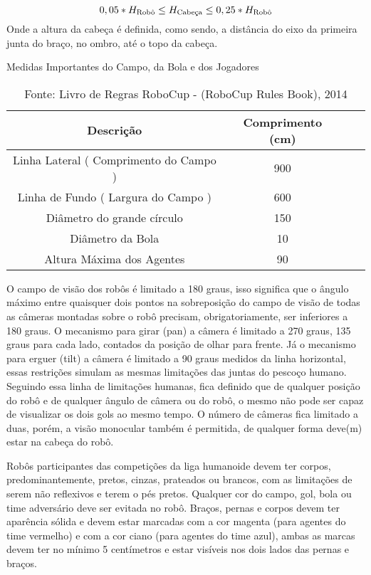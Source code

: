 \begin{equation}
0,05 * H_{\text{Robô}} \leq H_{\text{Cabeça}} \leq 0,25 * H_{\text{Robô}}  \\
\end{equation}
Onde a altura da cabeça é definida, como sendo, a distância do eixo da primeira junta do braço, no ombro, até o topo da cabeça.

\begin{table}[ht!]
    \caption{Medidas Importantes do Campo, da Bola e dos Jogadores} \label{tbl:medidas}
    \centering
    \begin{tabular}{|c|c|c|c|}
    \hline 
    Descrição & Comprimento (cm) \\ 
    \hline 
    Linha Lateral ( Comprimento do Campo ) & 900  \\ 
    \hline 
    Linha de Fundo ( Largura do Campo ) & 600 \\ 
    \hline 
    Diâmetro do grande círculo & 150 \\ 
    \hline 
    Diâmetro da Bola & 10 \\ 
    \hline 
    Altura Máxima dos Agentes & 90 \\ 
    \hline 

    \end{tabular}
    \caption*{Fonte: Livro de Regras RoboCup - (RoboCup Rules Book), 2014 \cite{Rules}}
\end{table}

O campo de visão dos robôs é limitado a 180 graus, isso significa que o ângulo máximo entre quaisquer dois pontos na sobreposição do campo de visão de todas as câmeras montadas sobre o robô precisam, obrigatoriamente, ser inferiores a 180 graus. O mecanismo para girar (pan) a câmera é limitado a 270 graus, 135 graus para cada lado, contados da posição de olhar para frente. Já o mecanismo para erguer (tilt) a câmera é limitado a 90 graus medidos da linha horizontal, essas restrições simulam as mesmas limitações das juntas do pescoço humano. Seguindo essa linha de limitações humanas, fica definido que de qualquer posição do robô e de qualquer ângulo de câmera ou do robô, o mesmo não pode ser capaz de visualizar os dois gols ao mesmo tempo. O número de câmeras fica limitado a duas, porém, a visão monocular também é permitida, de qualquer forma deve(m) estar na cabeça do robô.

Robôs participantes das competições da liga humanoide devem ter corpos, predominantemente, pretos, cinzas, prateados ou brancos, com as limitações de serem não reflexivos e terem o pés pretos. Qualquer cor do campo, gol, bola ou time adversário deve ser evitada no robô. Braços, pernas e corpos devem ter aparência sólida e devem estar marcadas com a cor magenta (para agentes do time vermelho) e com a cor ciano (para agentes do time azul), ambas as marcas devem ter no mínimo 5 centímetros e estar visíveis nos dois lados das pernas e braços.


